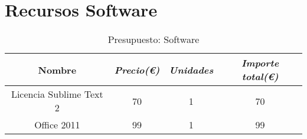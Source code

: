 \section{Recursos Software}

\begin{table}[htp]
	\centering
	\caption{Presupuesto: Software}\label{tab:budget-software}
	\begin{tabular}{cccc}
		\toprule
    	\textbf{Nombre} & \emph{Precio(\euro)} & \emph{Unidades} & \emph{Importe total(\euro)}\\
    	\midrule
    	Licencia Sublime Text 2		& 	70				&	1 			& 	70\\
    	Office 2011 				&	99				&	1			&	99\\
    	\bottomrule
    \end{tabular}
\end{table}